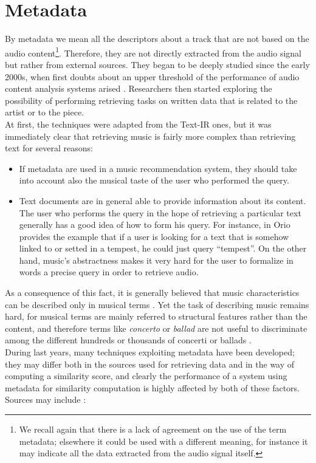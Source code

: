 \section{Metadata}
By metadata we mean all the descriptors about a track that are not based on the audio content\footnote{We recall again that there is a lack of agreement on the use of the term metadata; elsewhere it could be used with a different meaning, for instance it may indicate all the data extracted from the audio signal itself.}. Therefore, they are not directly extracted from the audio signal but rather from external sources. They began to be deeply studied since the early 2000s, when first doubts about an upper threshold of the performance of audio content analysis systems arised \cite{aucou04}. Researchers then started exploring the possibility of performing retrieving tasks on written data that is related to the artist or to the piece. \\At first, the techniques were adapted from the Text-IR ones, but it was immediately clear that retrieving music is fairly more complex than retrieving text for several reasons:
\begin{itemize}
\item If metadata are used in a music recommendation system, they should take into account also the musical taste of the user who performed the query.
\item Text documents are in general able to provide information about its content. The user who performs the query in the hope of retrieving a particular text generally has a good idea of how to form his query. For instance, in \cite{orio06} Orio provides the example that if a user is looking for a text that is somehow linked to or setted in a tempest, he could just query ``tempest''. On the other hand, music's abstractness makes it very hard for the user to formalize in words a precise query in order to retrieve audio. 
\end{itemize}
As a consequence of this fact, it is generally believed that music characteristics can be described only in musical terms \cite{orio06}. Yet the task of describing music remains hard, for musical terms are mainly referred to structural features rather than the content, and therefore terms like \textit{concerto} or \textit{ballad} are not useful to discriminate among the different hundreds or thousands of concerti or ballads \cite{orio06}. \\ 
During last years, many techniques exploiting metadata have been developed; they may differ both in the sources used for retrieving data and in the way of computing a similarity score, and clearly the performance of a system using metadata for similarity computation is highly affected by both of these factors. Sources may include \cite{bogdanov13}:
